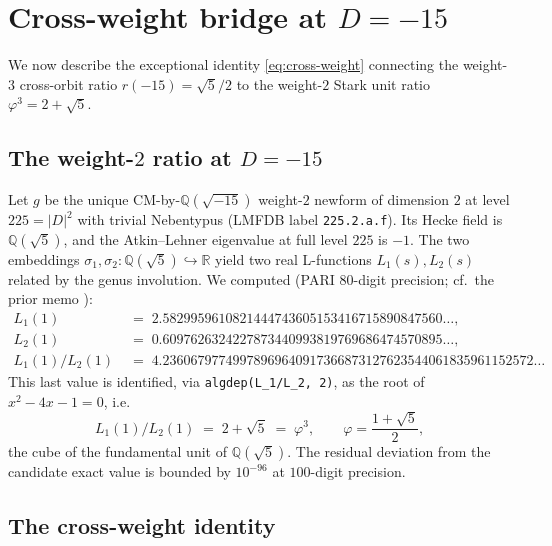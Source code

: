 \documentclass[11pt]{amsart}
\theoremstyle{definition}
\theoremstyle{remark}
\newcommand{\Q}{\mathbb{Q}}
\newcommand{\R}{\mathbb{R}}
\begin{document}
\section{Cross-weight bridge at \(D = -15\)}\label{sec:cross-weight}

We now describe the exceptional identity \eqref{eq:cross-weight}
connecting the weight-\(3\) cross-orbit ratio \(r(-15) = \sqrt{5}/2\)
to the weight-\(2\) Stark unit ratio \(\varphi^{3} = 2 + \sqrt{5}\).

\subsection{The weight-\(2\) ratio at \(D = -15\)}\label{ssec:wt2}

Let \(g\) be the unique CM-by-\(\Q(\sqrt{-15})\) weight-\(2\) newform
of dimension \(2\) at level \(225 = |D|^{2}\) with trivial
Nebentypus (LMFDB label \texttt{225.2.a.f}). Its Hecke field is
\(\Q(\sqrt{5})\), and the Atkin--Lehner eigenvalue at full level
\(225\) is \(-1\). The two embeddings
\(\sigma_{1}, \sigma_{2} \colon \Q(\sqrt{5}) \hookrightarrow \R\)
yield two real L-functions \(L_{1}(s), L_{2}(s)\) related by the
genus involution. We computed (PARI \(80\)-digit precision; cf.\
the prior memo \cite{Remondiere2026_BSDbridge}):
\begin{align*}
   L_{1}(1) &\;=\; 2.5829959610821444743605153416715890847560
                  \dots, \\
   L_{2}(1) &\;=\; 0.6097626324227873440993819769686474570895
                  \dots, \\
   L_{1}(1) / L_{2}(1)
            &\;=\; 4.2360679774997896964091736687312762354406
                   1835961152572\ldots
\end{align*}
This last value is identified, via \verb|algdep(L_1/L_2, 2)|, as
the root of \(x^{2} - 4x - 1 = 0\), i.e.\
\[
   L_{1}(1)/L_{2}(1) \;=\; 2 + \sqrt{5} \;=\; \varphi^{3},
   \qquad \varphi = \frac{1 + \sqrt{5}}{2},
\]
the cube of the fundamental unit of \(\Q(\sqrt{5})\). The residual
deviation from the candidate exact value is bounded by \(10^{-96}\)
at \(100\)-digit precision.

\subsection{The cross-weight identity}\label{ssec:cw-identity}
\end{document}
